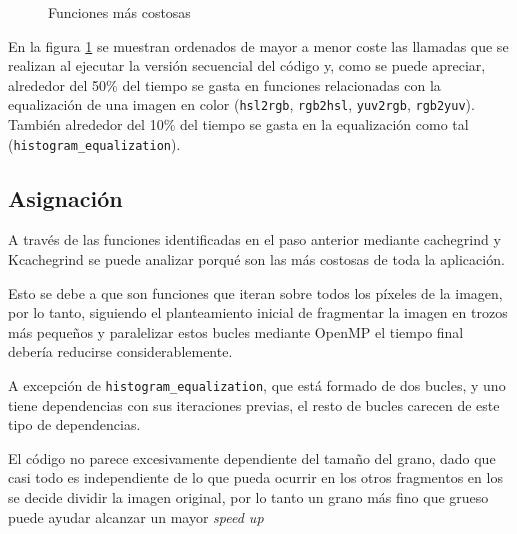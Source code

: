 \documentclass[12pt]{report} %
\begin{document}
\begin{figure}[H]
    \caption{Funciones más costosas}
    \label{fig:kcachegrind}
\end{figure}

En la figura \ref{fig:kcachegrind}  se muestran ordenados de mayor a menor coste las llamadas que se
realizan al ejecutar la versión secuencial del código y, como se puede apreciar, alrededor del 50\% del tiempo
se gasta en funciones relacionadas con la equalización de una imagen en color (\texttt{hsl2rgb}, \texttt{rgb2hsl},
\texttt{yuv2rgb}, \texttt{rgb2yuv}). También alrededor del 10\% del tiempo se gasta en la equalización como tal
(\texttt{histogram\_equalization}).


\subsection{Asignación}

A través de las funciones identificadas en el paso anterior mediante cachegrind y Kcachegrind se puede
analizar porqué son las más costosas de toda la aplicación.

Esto se debe a que son funciones que iteran sobre todos los píxeles de la imagen, por lo tanto, siguiendo el
planteamiento inicial de fragmentar la imagen en trozos más pequeños y paralelizar estos bucles mediante
OpenMP el tiempo final debería reducirse considerablemente.

A excepción de \texttt{histogram\_equalization}, que está formado de dos bucles, y uno tiene dependencias
con sus iteraciones previas, el resto de bucles carecen de este tipo de dependencias.

El código no parece excesivamente dependiente del tamaño del grano, dado que casi todo es independiente de
lo que pueda ocurrir en los otros fragmentos en los se decide dividir la imagen original, por lo tanto un
grano más fino que grueso puede ayudar alcanzar un mayor \textit{speed up}
\end{document}
